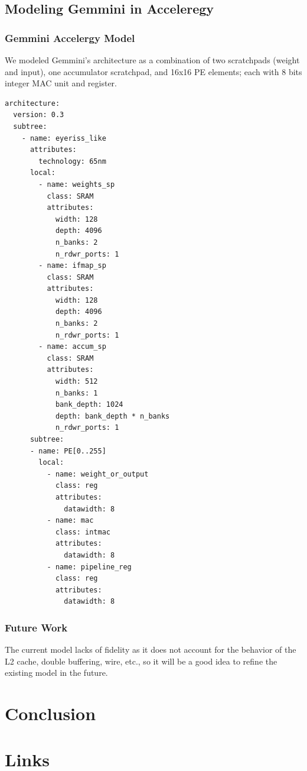 \documentclass[sigconf]{acmart}
\begin{document}
\subsection{Modeling Gemmini in Acceleregy}
\subsubsection{Gemmini Accelergy Model}
We modeled Gemmini's architecture as a combination of two scratchpads (weight and input), one accumulator scratchpad, and 16x16 PE elements; each with 8 bits integer MAC unit and register.

\begin{verbatim}
architecture:
  version: 0.3
  subtree:
    - name: eyeriss_like
      attributes:
        technology: 65nm
      local:
        - name: weights_sp
          class: SRAM
          attributes:
            width: 128
            depth: 4096
            n_banks: 2
            n_rdwr_ports: 1
        - name: ifmap_sp
          class: SRAM
          attributes:
            width: 128
            depth: 4096
            n_banks: 2
            n_rdwr_ports: 1
        - name: accum_sp
          class: SRAM
          attributes:
            width: 512
            n_banks: 1
            bank_depth: 1024
            depth: bank_depth * n_banks
            n_rdwr_ports: 1
      subtree:
      - name: PE[0..255]
        local:
          - name: weight_or_output
            class: reg
            attributes:
              datawidth: 8
          - name: mac
            class: intmac
            attributes:
              datawidth: 8
          - name: pipeline_reg
            class: reg
            attributes:
              datawidth: 8
\end{verbatim}

\subsubsection{Future Work}
The current model lacks of fidelity as it does not account for the behavior of the L2 cache, double buffering, wire, etc., so it will be a good idea to refine the existing model in the future.

\section{Conclusion}

\appendix
\section{Links}
\end{document}
